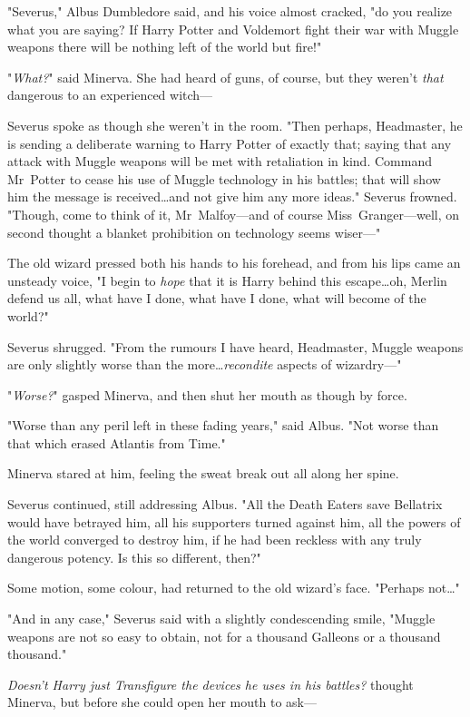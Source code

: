 "Severus," Albus Dumbledore said, and his voice almost cracked, "do you realize
what you are saying? If Harry Potter and Voldemort fight their war with Muggle
weapons there will be nothing left of the world but fire!"

"\emph{What?}" said Minerva. She had heard of guns, of course, but they weren't
\emph{that} dangerous to an experienced witch---

Severus spoke as though she weren't in the room. "Then perhaps, Headmaster, he
is sending a deliberate warning to Harry Potter of exactly that; saying that
any attack with Muggle weapons will be met with retaliation in kind. Command
Mr~Potter to cease his use of Muggle technology in his battles; that will show
him the message is received…and not give him any more ideas." Severus
frowned. "Though, come to think of it, Mr~Malfoy---and of course
Miss~Granger---well, on second thought a blanket prohibition on technology seems
wiser---"

The old wizard pressed both his hands to his forehead, and from his lips came
an unsteady voice, "I begin to \emph{hope} that it is Harry behind this
escape…oh, Merlin defend us all, what have I done, what have I done,
what will become of the world?"

Severus shrugged. "From the rumours I have heard, Headmaster, Muggle weapons are
only slightly worse than the more…\emph{recondite} aspects of
wizardry---"

"\emph{Worse?}" gasped Minerva, and then shut her mouth as though by force.

"Worse than any peril left in these fading years," said Albus. "Not worse than
that which erased Atlantis from Time."

Minerva stared at him, feeling the sweat break out all along her spine.

Severus continued, still addressing Albus. "All the Death Eaters save Bellatrix
would have betrayed him, all his supporters turned against him, all the powers
of the world converged to destroy him, if he had been reckless with any truly
dangerous potency. Is this so different, then?"

Some motion, some colour, had returned to the old wizard's face. "Perhaps
not…"

"And in any case," Severus said with a slightly condescending smile, "Muggle
weapons are not so easy to obtain, not for a thousand Galleons or a thousand
thousand."

\emph{Doesn't Harry just Transfigure the devices he uses in his battles?}
thought Minerva, but before she could open her mouth to ask---


